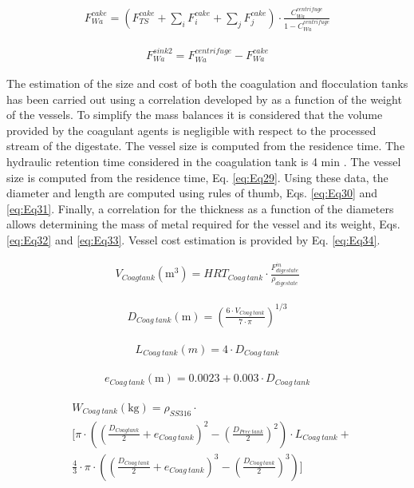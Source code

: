 \begin{refsection}[referencesCh2]
\begin{align}
	{F}_{Wa}^{cake} = \left( {F}_{TS}^{cake} + \sum\limits_i {F_i^{cake} + \sum\limits_j {F}_j^{cake}}  \right) \cdot \frac{{C_{Wa}^{centrifuge}}}{{1 - C_{Wa}^{centrifuge}}} \label{eq:Eq27}
\end{align}

\begin{align}
	{F}_{Wa}^{sink2} = F_{Wa}^{centrifuge} - F_{Wa}^{cake} \label{eq:Eq28}
\end{align}

The estimation of the size and cost of both the coagulation and ﬂocculation tanks has been carried out using a correlation developed by \citet{almena2016technoeconomic} as a function of the weight of the vessels. To simplify the mass balances it is considered that the volume provided by the coagulant agents is negligible with respect to the processed stream of the digestate. The vessel size is computed from the residence time. The hydraulic retention time considered in the coagulation tank is 4 min \citep{zhou2008enhanced}. The vessel size is computed from the residence time, Eq. \ref{eq:Eq29}. Using these data, the diameter and length are computed using rules of thumb, Eqs. \ref{eq:Eq30} and \ref{eq:Eq31}. Finally, a correlation for the thickness as a function of the diameters allows determining the mass of metal required for the vessel and its weight, Eqs. \ref{eq:Eq32} and \ref{eq:Eq33}. Vessel cost estimation is provided by Eq. \ref{eq:Eq34}.

\begin{align}
	{V}_{Coag tank}\left( \text{m}^{3} \right) = HR{T_{Coag \ tank}} \cdot \frac{F_{digestate}^{in}}{\rho_{digestate}} \label{eq:Eq29}
\end{align}

\begin{align}
	{D_{Coag \ tank}} \left( \text{m} \right) = \left( \frac{6 \cdot{V}_{Coag \ tank}}{7 \cdot \pi} \right)^{1/3} \label{eq:Eq30}
\end{align}

\begin{align}
	{L_{{{Coag \ tank}}}}\left( m \right) = 4\cdot{D_{Coag \ tank}} \label{eq:Eq31}
\end{align}

\begin{align}
	{e_{Coag \ tank}}\left( \text{m} \right) = 0.0023 + 0.003\cdot{D_{{{Coag \ tank}}}} \label{eq:Eq32}
\end{align}

\begin{align}
	& {W_{Coag \ tank}}\left( \text{kg} \right) = {\rho_{SS316}}\cdot \label{eq:Eq33} \\
	& \Bigg[ \pi \cdot \left( {{{\left( \frac{{{D_{Coag tank}}}}{2} + {e_{Coag \ tank}} \right)}^2} - {{\left( \frac{{{D_{Prec \ tank}}}}{2} \right)}^2}} \right)\cdot{L_{Coag \ tank}} + \nonumber \\ 
	& \frac{4}{3} \cdot \pi \cdot \left( \left( \frac{D_{Coag \ tank}}{2} + {e_{Coag \ tank}} \right)^3 - \left( \frac{D_{Coag \ tank}}{2} \right)^3 \right) \Bigg] \nonumber
\end{align}


\end{refsection}
